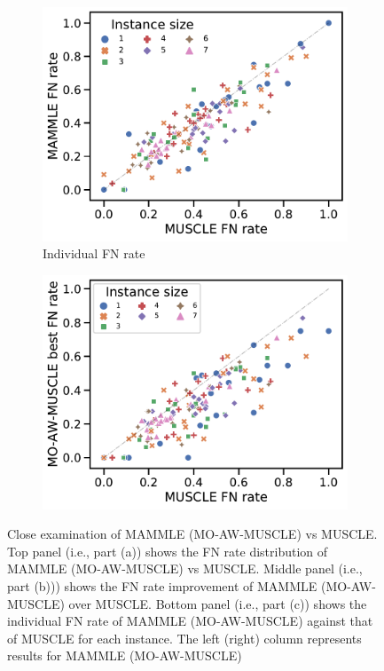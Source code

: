 \begin{figure}[!htbp]
\begin{adjustwidth}{-1.2cm}{}
		\begin{subfigure}{0.40\textwidth} \includegraphics[width=\textwidth]{Figure/delta5} \caption{Individual FN rate}\label{fig:scatter_fn}\end{subfigure}
		\begin{subfigure}{0.40\textwidth} \includegraphics[width=\textwidth]{Figure/delta5-momuscle} 
		\end{subfigure}
	\end{adjustwidth}
	\caption[Close examination of MAMMLE (MO-AW-MUSCLE) vs MUSCLE]{Close examination of MAMMLE (MO-AW-MUSCLE) vs MUSCLE. Top panel (i.e., part (a)) shows the FN rate distribution of MAMMLE (MO-AW-MUSCLE) vs MUSCLE. Middle panel (i.e., part (b))) shows the FN rate improvement of MAMMLE (MO-AW-MUSCLE) over MUSCLE. Bottom panel (i.e., part (c)) shows the individual FN rate of MAMMLE (MO-AW-MUSCLE) against that of MUSCLE for each instance. The left (right) column represents results for MAMMLE (MO-AW-MUSCLE) }
	\label{fig:mammle-result}
\end{figure}


